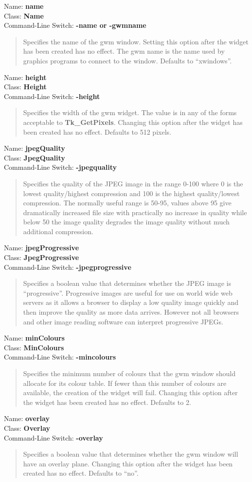 \documentclass[twoside,11pt,nolof]{starlink}
\providecommand{\option}[3]{\par
Name: {\textbf{#1}} \\
Class: {\textbf{#2}} \\
Command-Line Switch: {\textbf{#3}} }
\newenvironment{rquote}{\begin{quote}\raggedright}{\end{quote}}
\begin{document}
\option{name}{Name}{-name {\rm or} -gwmname}
\begin{rquote}
Specifies the name of the gwm window. Setting
this option after the widget has been created has no effect. The gwm name
is the name used by graphics programs to connect to the window. Defaults
to ``xwindows''.
\end{rquote}

\option{height}{Height}{-height}
\begin{rquote}
Specifies the width of the gwm widget. The value is in any of the forms
acceptable to \textbf{Tk\_GetPixels}. Changing this option after the widget
has been created has no effect. Defaults to 512 pixels.
\end{rquote}

\option{jpegQuality}{JpegQuality}{-jpegquality}
\begin{rquote}
Specifies the quality of the JPEG image in the range 0-100 where 0 is the
lowest quality/highest compression and 100 is the highest quality/lowest
compression. The normally useful range is 50-95, values above 95 give
dramatically increased file size with practically no increase in quality
while below 50 the image quality degrades the image quality without much
additional compression.
\end{rquote}

\option{jpegProgressive}{JpegProgressive}{-jpegprogressive}
\begin{rquote}
Specifies a boolean value that determines whether the JPEG image is
``progressive''. Progressive images are useful for use on world wide web
servers as it allows a browser to display a low quality image quickly and
then improve the quality as more data arrives. However not all browsers
and other image reading software can interpret progressive JPEGs.
\end{rquote}

\option{minColours}{MinColours}{-mincolours}
\begin{rquote}
Specifies the minimum number of colours that the gwm window should allocate
for its colour table. If fewer than this number of colours are available,
the creation of the widget will fail. Changing this option after the widget
has been created has no effect. Defaults to 2.
\end{rquote}

\option{overlay}{Overlay}{-overlay}
\begin{rquote}
Specifies a boolean value that determines whether the gwm window will have
an overlay plane.  Changing this option after the widget
has been created has no effect. Defaults to ``no''.
\end{rquote}
\end{document}
